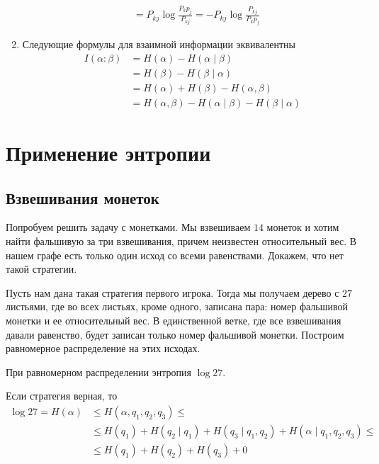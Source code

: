 \begin{prop}
\begin{enumerate}
\begin{proof*}
\begin{align*}
		        \tag{по неравенству Йенсена} \\
		        &= P_{kj} \log \frac{P_k p_j}{P_{kj}} 
		        = -P_{kj} \log \frac{P_{kj}}{P_k p_j}
		    \end{align*}
		\end{proof*}
		\item  Следующие формулы для взаимной информации эквивалентны
			\begin{align*}
				I( \alpha : \beta ) 
				&= H( \alpha) - H( \alpha  \mid \beta  ) \\
				&= H( \beta ) - H( \beta \mid \alpha ) \\
				&= H\left( \alpha  \right) + H( \beta ) - H( \alpha , \beta ) \\
			    &= H( \alpha , \beta ) - H( \alpha \mid \beta ) - H( \beta \mid \alpha )
			\end{align*}
	\end{enumerate}
\end{prop}

\section{Применение энтропии}
\subsection{Взвешивания монеток}
Попробуем решить задачу с монетками. Мы взвешиваем $ 14$ монеток и хотим найти фальшивую за три взвешивания, причем неизвестен относительный вес. В нашем графе есть только один исход со всеми равенствами. Докажем, что нет такой стратегии.

Пусть нам дана такая стратегия первого игрока.
Тогда мы получаем дерево с $ 27$ листьями, где во всех листьях, кроме одного, записана пара:
номер фальшивой монетки и ее относительный вес.
В единственной ветке, где все взвешивания давали равенство, будет записан только номер фальшивой монетки.
Построим равномерное распределение на этих исходах.

При равномерном распределении энтропия $ \log 27$.

Если стратегия верная, то
\begin{align*}
\log 27 = H(\alpha) &\le  H( \alpha, q_1, q_2, q_3) \le \\ &\le H( q_1 ) + H(q_{2} \mid q_1 )+ H(q_3 \mid q_1, q_2)+ H( \alpha  \mid q_1, q_2, q_3 ) \le \tag{Chain rule}\\  
			& \le  H(q_1) + H(q_2) + H(q_3) + 0
\end{align*}

